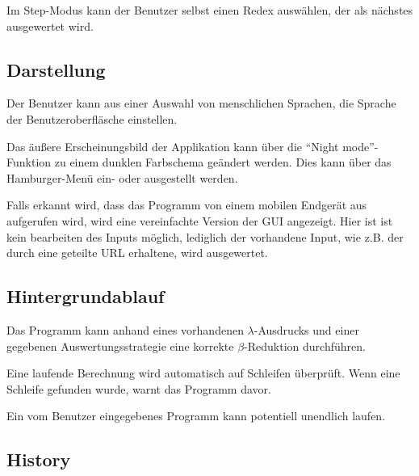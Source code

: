 \documentclass[parskip=full,11pt,twoside]{scrartcl}
\begin{document}
Im Step-Modus kann der Benutzer selbst einen Redex auswählen, der als nächstes ausgewertet wird.




\subsection{Darstellung}

Der Benutzer kann aus einer Auswahl von menschlichen Sprachen, die Sprache der Benutzeroberfläsche einstellen.

Das äußere Erscheinungsbild der Applikation kann über die \enquote{Night mode}-Funktion zu einem dunklen Farbschema geändert werden. Dies kann über das Hamburger-Menü ein- oder ausgestellt werden.

Falls erkannt wird, dass das Programm von einem mobilen Endgerät aus aufgerufen wird, wird eine vereinfachte Version der GUI angezeigt. Hier ist ist kein bearbeiten des Inputs möglich, lediglich der vorhandene Input, wie z.B. der durch eine geteilte URL erhaltene, wird ausgewertet.




\subsection{Hintergrundablauf}

Das Programm kann anhand eines vorhandenen $\lambda$-Ausdrucks und einer gegebenen Auswertungsstrategie eine korrekte $\beta$-Reduktion durchführen.

Eine laufende Berechnung wird automatisch auf Schleifen überprüft. Wenn eine Schleife gefunden wurde, warnt das Programm davor.

Ein vom Benutzer eingegebenes Programm kann potentiell unendlich laufen.




\subsection{History}
\end{document}
